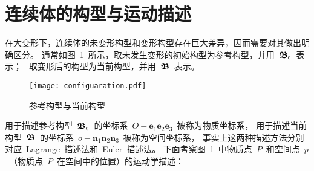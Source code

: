 \section{连续体的构型与运动描述}\label{content:coord}
在大变形下，连续体的未变形构型和变形构型存在巨大差异，因而需要对其做出明确区分。
通常如图~\ref{fig:config}~所示，取未发生变形的初始构型为参考构型，并用~$\bm{\mathfrak{B}}_{\scriptscriptstyle 0}$~表示；~
取变形后的构型为当前构型，并用~$\bm{\mathfrak{B}}$~表示。

\begin{figure}[!h]
	\centering
	\texttt{[image: configuaration.pdf]}
	\caption{参考构型与当前构型}
	\label{fig:config}
\end{figure}

用于描述参考构型~$\bm{\mathfrak{B}}_{\scriptscriptstyle 0}$~的坐标系~$O-\bm{e}_1\bm{e}_2\bm{e}_3$~被称为物质坐标系，
用于描述当前构型~$\bm{\mathfrak{B}}$~的坐标系~$o-\bm{n}_1\bm{n}_2\bm{n}_3$~被称为空间坐标系，
事实上这两种描述方法分别对应~Lagrange~描述法和~Euler~描述法。
下面考察图~\ref{fig:config}~中物质点~$P$~和空间点~$p$~（物质点~$P$~在空间中的位置）的运动学描述：
